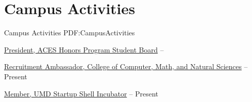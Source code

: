 
\section
{Campus Activities}
{Campus Activities}
{PDF:CampusActivities}

\BulletItem
\href{http://aces.umd.edu/}
{President,
ACES Honors Program Student Board}
\hfill
{} --

\GapNoBreak
\BulletItem
\href{https://cmns.umd.edu/undergraduate/admissions/recruitment-ambassadors}
{Recruitment Ambassador,
College of Computer, Math, and Natural Sciences}
\hfill
{} --
Present

\GapNoBreak
\BulletItem
\href{http://startupshell.org/}
{Member,
UMD Startup Shell Incubator}
\hfill
{} --
Present
\GapNoBreak